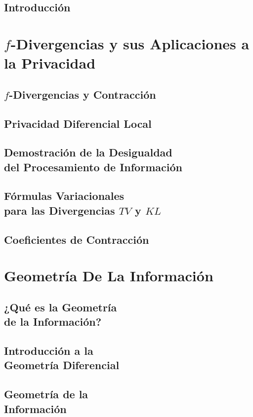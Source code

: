\documentclass[12pt,a4paper,twoside]{report}
\theoremstyle{definition}
\begin{document}
    \chapter*{Introducci\'on}
    
    \part{$f$-Divergencias y sus Aplicaciones a la Privacidad}
    \chapter{$f$-Divergencias y Contracci\'on}
    
    \chapter{Privacidad Diferencial Local}
    
    \chapter{Demostraci\'on de la Desigualdad\\ del Procesamiento de Informaci\'on}
    
    \chapter{F\'ormulas Variacionales\\
    para las Divergencias $TV$ y $KL$}
    
    \chapter{Coeficientes de Contracci\'on}
    
    \part{Geometr\'ia De La Informaci\'on}
    \chapter{¿Qu\'e es la Geometr\'ia\\
    de la Informaci\'on?}
    
    \chapter{Introducci\'on a la\\
    Geometr\'ia Diferencial}
    
    \chapter{Geometr\'ia de la \\
    Informaci\'on}
    

\end{document}
